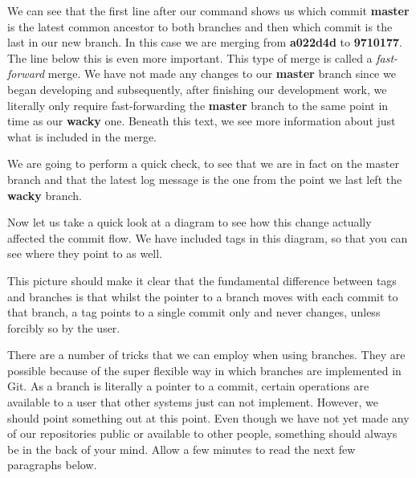 We can see that the first line after our  command shows us which commit \textbf{master} is the latest common ancestor to both branches and then which commit is the last in our new branch.
In this case we are merging from \textbf{a022d4d} to \textbf{9710177}.
The line below this is even more important.
This type of merge is called a \emph{fast-forward} merge.
We have not made any changes to our \textbf{master} branch since we began developing and subsequently, after finishing our development work, we literally only require fast-forwarding the \textbf{master} branch to the same point in time as our \textbf{wacky} one.
Beneath this text, we see more information about just what is included in the merge.

We are going to perform a quick check, to see that we are in fact on the master branch and that the latest log message is the one from the point we last left the \textbf{wacky} branch.


Now let us take a quick look at a diagram to see how this change actually affected the commit flow.
We have included tags in this diagram, so that you can see where they point to as well.


This picture should make it clear that the fundamental difference between tags and branches is that whilst the pointer to a branch moves with each commit to that branch, a tag points to a single commit only and never changes, unless forcibly so by the user.

There are a number of tricks that we can employ when using branches.
They are possible because of the super flexible way in which branches are implemented in Git.
As a branch is literally a pointer to a commit, certain operations are available to a user that other systems just can not implement.
However, we should point something out at this point.
Even though we have not yet made any of our repositories public or available to other people, something should always be in the back of your mind.
Allow a few minutes to read the next few paragraphs below.

